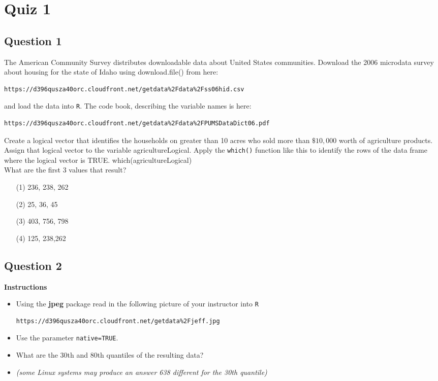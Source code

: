 \documentclass[]{article}
\begin{document}
\section{Quiz 1}
\subsection*{Question 1}
The American Community Survey distributes downloadable data about United States communities. Download the 2006 microdata survey about housing for the state of Idaho using download.file() from here: 
\begin{verbatim}
https://d396qusza40orc.cloudfront.net/getdata%2Fdata%2Fss06hid.csv 
\end{verbatim}
and load the data into \texttt{R}. The code book, describing the variable names is here: 
\begin{verbatim}
https://d396qusza40orc.cloudfront.net/getdata%2Fdata%2FPUMSDataDict06.pdf 
\end{verbatim}

\noindent Create a logical vector that identifies the households on greater than 10 acres who sold more than $\$10,000$ worth of agriculture products. 
\\
Assign that logical vector to the variable agricultureLogical. Apply the \texttt{which()} function like this to identify the rows of the data frame where the logical vector is TRUE. which(agricultureLogical) 
\\
What are the first 3 values that result?
\begin{itemize}
\item[(1)] 236, 238, 262
\item[(2)] 25, 36, 45
\item[(3)] 403, 756, 798
\item[(4)] 125, 238,262
\end{itemize}
\newpage
\subsection*{Question 2}
\textbf{Instructions}
\begin{itemize}
\item Using the \textbf{jpeg} package read in the following picture of your instructor into \texttt{R} 

\begin{verbatim}
https://d396qusza40orc.cloudfront.net/getdata%2Fjeff.jpg 
\end{verbatim}

\item Use the parameter \texttt{native=TRUE}. 
\item What are the 30th and 80th quantiles of the resulting data? 

\item \textit{(some Linux systems may produce an answer 638 different for the 30th quantile)}
\end{itemize}
\end{document}
